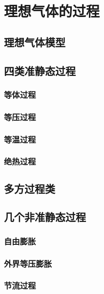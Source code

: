 

\section{理想气体的过程}\label{10-3}

\subsection{理想气体模型}\label{10-3-1}

\subsection{四类准静态过程}\label{10-3-2}

\subsubsection{等体过程}\label{10-3-2-1}

\subsubsection{等压过程}\label{10-3-2-2}

\subsubsection{等温过程}\label{10-3-2-3}

\subsubsection{绝热过程}\label{10-3-2-4}

\subsection{多方过程类}\label{10-3-3}

\subsection{几个非准静态过程}\label{10-3-4}

\subsubsection{自由膨胀}\label{10-3-4-1}

\subsubsection{外界等压膨胀}\label{10-3-4-2}

\subsubsection{节流过程}\label{10-3-4-3}